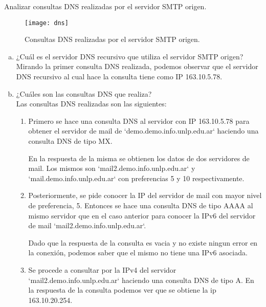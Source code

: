 \documentclass[osajnl,twocolumn,showpacs,superscriptaddress,10pt]{revtex4-1} %
\begin{document}
Analizar consultas DNS realizadas por el servidor SMTP origen.

\begin{figure}[H]
    \centering
    \texttt{[image: dns]}
    \caption{Consultas DNS realizadas por el servidor SMTP origen.}
\end{figure}

\begin{enumerate}[a)]
  \item ¿Cuál es el servidor DNS recursivo que utiliza el servidor SMTP origen? \\

  Mirando la primer consulta DNS realizada, podemos observar que el servidor DNS recursivo al cual hace la consulta tiene como IP 163.10.5.78. \\

  \item ¿Cuáles son las consultas DNS que realiza? \\

  Las consultas DNS realizadas son las siguientes:

  \begin{enumerate}[1.]
    \item Primero se hace una consulta DNS al servidor con IP 163.10.5.78 para obtener el servidor de mail de `demo.demo.info.unlp.edu.ar` haciendo una consulta DNS de tipo MX.

    En la respuesta de la misma se obtienen los datos de dos servidores de mail. Los mismos son `mail2.demo.info.unlp.edu.ar` y `mail.demo.info.unlp.edu.ar` con preferencias 5 y 10 respectivamente. \\

    \item Posteriormente, se pide conocer la IP del servidor de mail con mayor nivel de preferencia, 5. Entonces se hace una consulta DNS de tipo AAAA al mismo servidor que en el caso anterior para conocer la IPv6 del servidor de mail `mail2.demo.info.unlp.edu.ar`.

    Dado que la respuesta de la consulta es vacia y no existe ningun error en la conexión, podemos saber que el mismo no tiene una IPv6 asociada. \\

    \item Se procede a consultar por la IPv4 del servidor `mail2.demo.info.unlp.edu.ar` haciendo una consulta DNS de tipo A. En la respuesta de la consulta podemos ver que se obtiene la ip 163.10.20.254. \\


\end{enumerate}
\end{enumerate}
\end{document}
